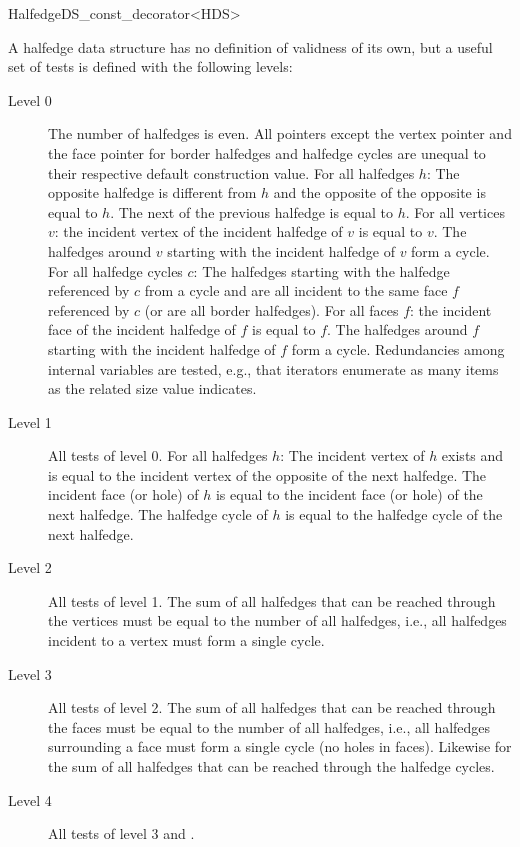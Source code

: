 \begin{ccRefClass}{HalfedgeDS_const_decorator<HDS>}

A halfedge data structure has no definition of validness of its own,
but a useful set of tests is defined with the following levels:
%
\begin{description}
\item[Level 0] 
  The number of halfedges is even. All pointers except
  the vertex pointer and the face pointer for border halfedges and halfedge cycles
  are unequal to their respective default construction value.  For all
  halfedges $h$: The opposite halfedge is different from $h$ and the
  opposite of the opposite is equal to $h$. The next of the previous
  halfedge is equal to $h$. For all vertices $v$: the incident vertex
  of the incident halfedge of $v$ is equal to $v$. The halfedges
  around $v$ starting with the incident halfedge of $v$ form a cycle.
  For all halfedge cycles $c$: The halfedges starting with the halfedge 
  referenced by $c$ from a cycle and are all incident to the same face 
  $f$ referenced by $c$ (or are all border halfedges).
  For all faces $f$: the incident face of the incident halfedge of $f$
  is equal to $f$. The halfedges around $f$ starting with the incident
  halfedge of $f$ form a cycle.
  Redundancies among internal variables
  are tested, e.g., that iterators enumerate as many items as the
  related size value indicates.
\item[Level 1] 
  All tests of level 0. For all halfedges $h$: The
  incident vertex of $h$ exists and is equal to the incident vertex of
  the opposite of the next halfedge. The incident face (or hole) of
  $h$ is equal to the incident face (or hole) of the next halfedge.
  The halfedge cycle of $h$ is equal to the  halfedge cycle
   of the next halfedge.
\item[Level 2]
  All tests of level 1. The sum of all halfedges that can
  be reached through the vertices must be equal to the number of all
  halfedges, i.e., all halfedges incident to a vertex must form a single
  cycle.
\item[Level 3]
  All tests of level 2. The sum of all halfedges that can
  be reached through the faces must be equal to the number of all
  halfedges, i.e., all halfedges surrounding a face must form a single
  cycle (no holes in faces). Likewise for the sum of all halfedges that
  can be reached through the halfedge cycles.
\item[Level 4]
  All tests of level 3 and .
\end{description}


\end{ccRefClass}
